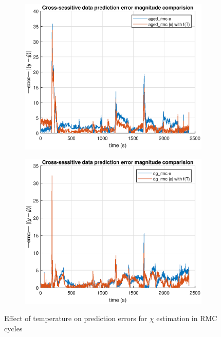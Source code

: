 \begin{figure}[H]
    \begin{minipage}{0.49\textwidth}
        \begin{figure}[H]
            \includegraphics[width=\textwidth]{./figs/chi_est/aged_error_comp.eps}
        \end{figure}
    \end{minipage}
    \begin{minipage}{0.49\textwidth}
        \begin{figure}[H]
            \includegraphics[width=\textwidth]{./figs/chi_est/dg_error_comp.eps}
        \end{figure}
    \end{minipage}
        \caption{Effect of temperature on prediction errors for $\chi$ estimation in RMC cycles}
\end{figure}
